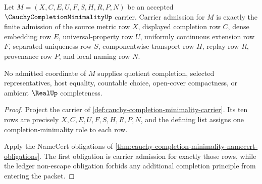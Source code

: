 \begin{theorem}
\label{thm:cauchy-completion-minimality-carrier-admission}
Let $M=(X,C,E,U,F,S,H,R,P,N)$ be an accepted $\CauchyCompletionMinimalityUp$ carrier. Carrier admission for $M$ is exactly the finite admission of the source metric row $X$, displayed completion row $C$, dense embedding row $E$, universal-property row $U$, uniformly continuous extension row $F$, separated uniqueness row $S$, componentwise transport row $H$, replay row $R$, provenance row $P$, and local naming row $N$.

No admitted coordinate of $M$ supplies quotient completion, selected representatives, host equality, countable choice, open-cover compactness, or ambient $\RealUp$ completeness.
\end{theorem}
\begin{proof}
Project the carrier of \autoref{def:cauchy-completion-minimality-carrier}. Its ten rows are precisely $X,C,E,U,F,S,H,R,P,N$, and the defining list assigns one completion-minimality role to each row.

Apply the NameCert obligations of \autoref{thm:cauchy-completion-minimality-namecert-obligations}. The first obligation is carrier admission for exactly those rows, while the ledger non-escape obligation forbids any additional completion principle from entering the packet.
\end{proof}

